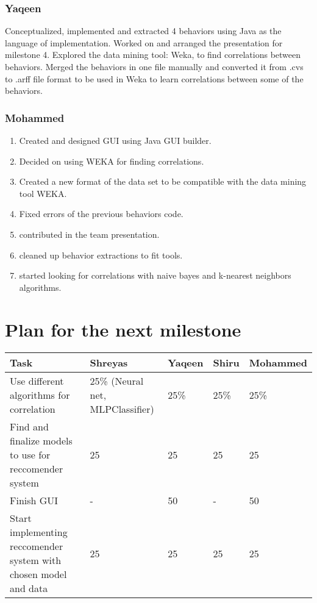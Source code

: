 \documentclass[12pt]{article}
\begin{document}
	\subsubsection{Yaqeen}
	Conceptualized, implemented and extracted 4 behaviors using Java as the language of implementation. Worked on and arranged the presentation for milestone 4. Explored the data mining tool: Weka, to find correlations between behaviors. Merged the behaviors in one file manually and converted it from .cvs to .arff file format to be used in Weka to learn correlations between some of the behaviors.
	
	\subsubsection{Mohammed}
	\begin{enumerate}
		\item Created and designed GUI using Java GUI builder.
		\item Decided on using WEKA for finding correlations.
		\item Created a new format of the data set to be compatible with the data mining tool WEKA.
		\item Fixed errors of the previous behaviors code.
		\item contributed in the team presentation.
		\item cleaned up behavior extractions to fit tools.
		\item started looking for correlations with naive bayes and k-nearest neighbors algorithms.
	\end{enumerate}
	
	
	\section{Plan for the next milestone}
	\begin{tabularx}{\linewidth}{|X|X|X|X|X|}
	\hline	\textbf{Task} & \textbf{Shreyas} & \textbf{Yaqeen} & \textbf{Shiru} & \textbf{Mohammed} \\ \hline
	Use different algorithms for correlation &25\% (Neural net, MLPClassifier) & 25\% & 25\% & 25\% \\ \hline
	Find and finalize models to use for reccomender system & 25 & 25 & 25 & 25 \\ \hline
	Finish GUI & - & 50 & - & 50 \\ \hline
	Start implementing reccomender system with chosen model and data & 25 & 25&25&25\\ \hline
	\end{tabularx}
\end{document}

